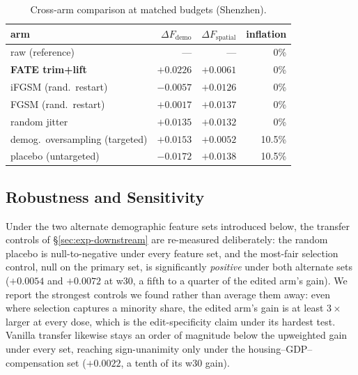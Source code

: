 \begin{table}[t]
\centering
\caption{Cross-arm comparison at matched budgets (Shenzhen).}
\label{tab:baselines}
\footnotesize
\setlength{\tabcolsep}{4pt}
\begin{tabular}{lrrr}
\toprule
arm & $\Delta F_{\mathrm{demo}}$ & $\Delta F_{\mathrm{spatial}}$ & inflation \\
\midrule
raw (reference) & --- & --- & 0\% \\
\textbf{FATE trim+lift} & $\mathbf{+0.0226}$ & $+0.0061$ & 0\% \\
iFGSM (rand.\ restart) & $-0.0057$ & $+0.0126$ & 0\% \\
FGSM (rand.\ restart) & $+0.0017$ & $+0.0137$ & 0\% \\
random jitter & $+0.0135$ & $+0.0132$ & 0\% \\
demog.\ oversampling (targeted) & $+0.0153$ & $+0.0052$ & 10.5\% \\
\quad placebo (untargeted) & $-0.0172$ & $+0.0138$ & 10.5\% \\
\bottomrule
\end{tabular}
\end{table}

\subsection{Robustness and Sensitivity}\label{sec:exp-robustness}

Under the two alternate demographic feature sets introduced below, the
transfer controls of \S\ref{sec:exp-downstream} are re-measured
deliberately: the random placebo is
null-to-negative under every feature set, and the most-fair selection
control, null on the primary set, is significantly \emph{positive}
under both alternate sets ($+0.0054$ and $+0.0072$ at w30, a fifth to a
quarter of the edited arm's gain). We report the strongest controls we
found rather than average them away: even where selection captures a
minority share, the edited arm's gain is at least $3\times$ larger at
every dose, which is the edit-specificity claim under its hardest test.
Vanilla transfer likewise stays an order of magnitude below the upweighted
gain under every set, reaching sign-unanimity only under the
housing--GDP--compensation set ($+0.0022$, a tenth of its w30 gain).


